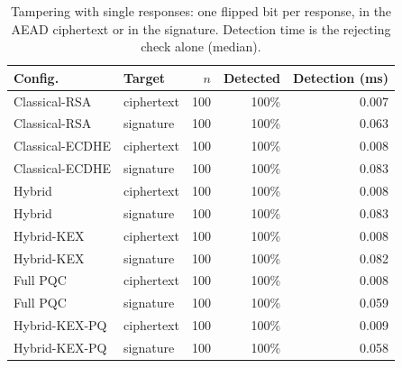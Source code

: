 \begin{table}[t]
\centering
\caption{Tampering with single responses: one flipped bit per response, in the AEAD ciphertext or in the signature. Detection time is the rejecting check alone (median).}
\label{tab:threats}
\setlength{\tabcolsep}{4pt}
\footnotesize
\begin{tabular}{@{}llrrr@{}}
\toprule
Config. & Target & $n$ & Detected & Detection (ms) \\
\midrule
Classical-RSA & ciphertext & 100 & 100\% & 0.007 \\
Classical-RSA & signature & 100 & 100\% & 0.063 \\
Classical-ECDHE & ciphertext & 100 & 100\% & 0.008 \\
Classical-ECDHE & signature & 100 & 100\% & 0.083 \\
Hybrid & ciphertext & 100 & 100\% & 0.008 \\
Hybrid & signature & 100 & 100\% & 0.083 \\
Hybrid-KEX & ciphertext & 100 & 100\% & 0.008 \\
Hybrid-KEX & signature & 100 & 100\% & 0.082 \\
Full PQC & ciphertext & 100 & 100\% & 0.008 \\
Full PQC & signature & 100 & 100\% & 0.059 \\
Hybrid-KEX-PQ & ciphertext & 100 & 100\% & 0.009 \\
Hybrid-KEX-PQ & signature & 100 & 100\% & 0.058 \\
\bottomrule
\end{tabular}
\end{table}
